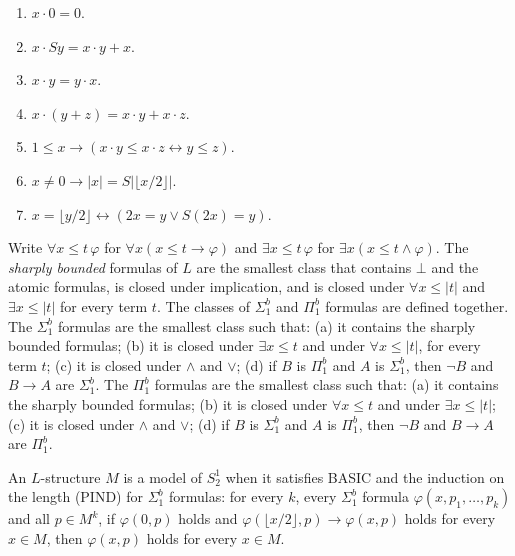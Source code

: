 \begin{definition}
\begin{enumerate}
    \item $x \cdot 0 = 0$.
    \item $x \cdot Sy = x \cdot y + x$.
    \item $x \cdot y = y \cdot x$.
    \item $x \cdot (y + z) = x \cdot y + x \cdot z$.
    \item $1 \le x \to (x \cdot y \le x \cdot z \leftrightarrow y \le z)$.
    \item $x \ne 0 \to |x| = S|\lfloor x/2 \rfloor|$.
    \item $x = \lfloor y/2 \rfloor \leftrightarrow (2x = y \vee S(2x) = y)$.
  \end{enumerate}
\end{definition}

\begin{definition}
  \label{def:arithmetic-sigma1}
  \leanok
  \own{}
  \infrastructure{}
  Write $\forall x \le t\, \varphi$ for $\forall x (x \le t \to \varphi)$ and $\exists x \le t\,
  \varphi$ for $\exists x (x \le t \wedge \varphi)$. The \emph{sharply bounded} formulas of $L$ are
  the smallest class that contains $\bot$ and the atomic formulas, is closed under implication, and
  is closed under $\forall x \le |t|$ and $\exists x \le |t|$ for every term $t$. The classes of
  $\Sigma^b_1$ and $\Pi^b_1$ formulas are defined together. The $\Sigma^b_1$ formulas are the
  smallest class such that: (a) it contains the sharply bounded formulas; (b) it is closed under
  $\exists x \le t$ and under $\forall x \le |t|$, for every term $t$; (c) it is closed under
  $\wedge$ and $\vee$; (d) if $B$ is $\Pi^b_1$ and $A$ is $\Sigma^b_1$, then $\neg B$ and $B \to A$
  are $\Sigma^b_1$. The $\Pi^b_1$ formulas are the smallest class such that: (a) it contains the
  sharply bounded formulas; (b) it is closed under $\forall x \le t$ and under $\exists x \le |t|$;
  (c) it is closed under $\wedge$ and $\vee$; (d) if $B$ is $\Sigma^b_1$ and $A$ is $\Pi^b_1$, then
  $\neg B$ and $B \to A$ are $\Pi^b_1$.
\end{definition}

\begin{definition}[Models of $S^1_2$]
  \label{def:arithmetic-s12-model}
  \leanok
  An $L$-structure $M$ is a model of $S^1_2$ when it satisfies BASIC and the induction on the
  length (PIND) for $\Sigma^b_1$ formulas: for every $k$, every $\Sigma^b_1$ formula $\varphi(x,
  p_1, \dots, p_k)$ and all $p \in M^k$, if $\varphi(0, p)$ holds and $\varphi(\lfloor x/2 \rfloor,
  p) \to \varphi(x, p)$ holds for every $x \in M$, then $\varphi(x, p)$ holds for every $x \in M$.
\end{definition}

